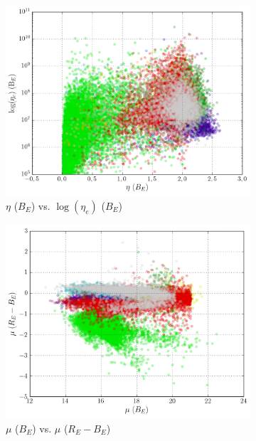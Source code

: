 \begin{figure}[h]
\begin{subfigure}[t]{0.49\textwidth}
	\end{subfigure}
	\begin{subfigure}[t]{0.49\textwidth}
		\centering
		\caption{$\eta$ ($B_E$) vs. $\log(\eta_e)$ ($B_E$)}
		\label{fig:2c}
		\includegraphics[width=\textwidth]{figures/scatterplots/B-eta-B-eta-e.png}		
	\end{subfigure}
	\begin{subfigure}[t]{0.49\textwidth}
		\centering
		\caption{$\mu$ ($B_E$) vs. $\mu$ ($R_E - B_E$)}
		\label{fig:2d}
		\includegraphics[width=\textwidth]{figures/scatterplots/B-mean-R-B-mean.png}		
	\end{subfigure}
	\begin{subfigure}[t]{0.49\textwidth}

\end{subfigure}
\end{figure}
